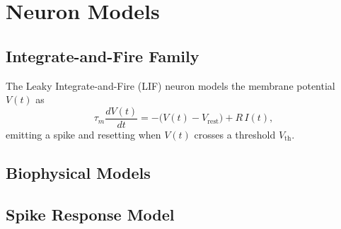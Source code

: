 \section{Neuron Models}
\label{sec:neuron_models}


\subsection{Integrate-and-Fire Family}
The Leaky Integrate-and-Fire (LIF) neuron models the membrane potential $V(t)$ as
\begin{equation}
  \tau_m \frac{dV(t)}{dt} = -\big(V(t) - V_{\text{rest}}\big) + R\, I(t),
  \label{eq:lif}
\end{equation}
emitting a spike and resetting when $V(t)$ crosses a threshold $V_{\text{th}}$.

\subsection{Biophysical Models}

\subsection{Spike Response Model}
